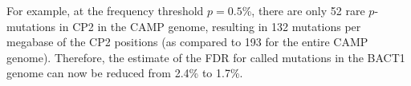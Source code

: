 For example, at the frequency threshold $p=0.5$\%, there are only 52 rare $p$-mutations in CP2 in the CAMP genome, resulting in 132 mutations per megabase of the CP2 positions (as compared to 193 for the entire CAMP genome). Therefore, the estimate of the FDR for called mutations in the BACT1 genome can now be reduced from 2.4\% to 1.7\%.\endinput